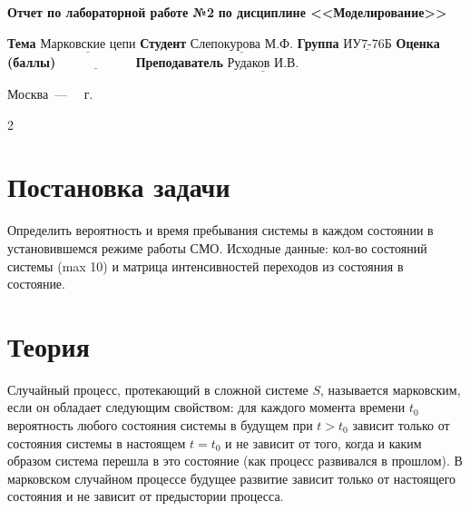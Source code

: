 \documentclass[12pt]{report}
\begin{document}
\begin{titlepage}
		\begin{center}
			\noindent\begin{minipage}{1.1\textwidth}\centering
				\Large\textbf{Отчет по лабораторной работе №2}\newline
				\textbf{по дисциплине <<Моделирование>>}\newline\newline
			\end{minipage}
		\end{center}
		
		\noindent\textbf{Тема} $\underline{\text{Марковские цепи}}$\newline\newline
		\noindent\textbf{Студент} $\underline{\text{Слепокурова М.Ф.}}$\newline\newline
		\noindent\textbf{Группа} $\underline{\text{ИУ7-76Б}}$\newline\newline
		\noindent\textbf{Оценка (баллы)} $\underline{\text{~~~~~~~~~~~~~~~~~}}$\newline\newline
		\noindent\textbf{Преподаватель} $\underline{\text{Рудаков И.В.}}$\newline\newline\newline
		
		\begin{center}
			\vfill
			Москва~---~\the\year
			~г.
		\end{center}
	\end{titlepage}

\setcounter{page} {2}





\section*{Постановка задачи}
Определить вероятность и время пребывания системы в каждом состоянии в установившемся режиме работы СМО. Исходные данные: кол-во состояний системы (max 10) и матрица интенсивностей переходов из состояния в состояние.

\section*{Теория}
Случайный процесс, протекающий в сложной системе $S$, называется марковским, если он обладает следующим свойством:  для каждого момента времени $t_0$ вероятность любого состояния системы в будущем при $t > t_0$ зависит только от состояния системы в настоящем $t = t_0$ и не зависит от того, когда и каким образом система перешла в это состояние (как процесс развивался в прошлом). В марковском случайном процессе будущее развитие зависит только от настоящего состояния и не зависит от предыстории процесса.
\newline
\end{document}
